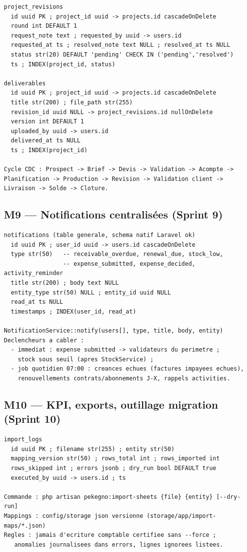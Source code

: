 \documentclass[11pt,a4paper]{article}
\begin{document}
\begin{lstlisting}
project_revisions
  id uuid PK ; project_id uuid -> projects.id cascadeOnDelete
  round int DEFAULT 1
  request_note text ; requested_by uuid -> users.id
  requested_at ts ; resolved_note text NULL ; resolved_at ts NULL
  status str(20) DEFAULT 'pending' CHECK IN ('pending','resolved')
  ts ; INDEX(project_id, status)

deliverables
  id uuid PK ; project_id uuid -> projects.id cascadeOnDelete
  title str(200) ; file_path str(255)
  revision_id uuid NULL -> project_revisions.id nullOnDelete
  version int DEFAULT 1
  uploaded_by uuid -> users.id
  delivered_at ts NULL
  ts ; INDEX(project_id)

Cycle CDC : Prospect -> Brief -> Devis -> Validation -> Acompte ->
Planification -> Production -> Revision -> Validation client ->
Livraison -> Solde -> Cloture.
\end{lstlisting}

\subsection{M9 --- Notifications centralisées (Sprint 9)}

\begin{lstlisting}
notifications (table generale, schema natif Laravel ok)
  id uuid PK ; user_id uuid -> users.id cascadeOnDelete
  type str(50)   -- receivable_overdue, renewal_due, stock_low,
                 -- expense_submitted, expense_decided, activity_reminder
  title str(200) ; body text NULL
  entity_type str(50) NULL ; entity_id uuid NULL
  read_at ts NULL
  timestamps ; INDEX(user_id, read_at)

NotificationService::notify(users[], type, title, body, entity)
Declencheurs a cabler :
  - immediat : expense submitted -> validateurs du perimetre ;
    stock sous seuil (apres StockService) ;
  - job quotidien 07:00 : creances echues (factures impayees echues),
    renouvellements contrats/abonnements J-X, rappels activities.
\end{lstlisting}

\subsection{M10 --- KPI, exports, outillage migration (Sprint 10)}

\begin{lstlisting}
import_logs
  id uuid PK ; filename str(255) ; entity str(50)
  mapping_version str(50) ; rows_total int ; rows_imported int
  rows_skipped int ; errors jsonb ; dry_run bool DEFAULT true
  executed_by uuid -> users.id ; ts

Commande : php artisan pekegno:import-sheets {file} {entity} [--dry-run]
Mappings : config/storage json versionne (storage/app/import-maps/*.json)
Regles : jamais d'ecriture comptable certifiee sans --force ;
   anomalies journalisees dans errors, lignes ignorees listees.
\end{lstlisting}
\end{document}
